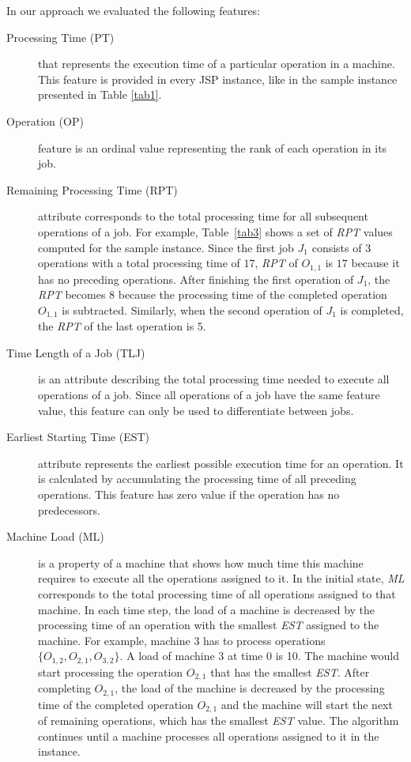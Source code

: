 \documentclass[runningheads]{llncs}
\begin{document}
In our approach we evaluated the following features:
\begin{description}
  \item[Processing Time (PT)] that represents the execution time of a particular operation in a machine. This feature is provided in every JSP instance, like in the sample instance presented in Table \ref{tab1}.
  
  \item[Operation (OP)] feature is an ordinal value representing the rank of each operation in its job.

  \item[Remaining Processing Time (RPT)] attribute corresponds to the total processing time for all subsequent operations of a job. For example, Table~\ref{tab3} shows a set of \textit{RPT} values computed for the sample instance. Since the first job $J_1$ consists of $3$ operations with a total processing time of $17$, \textit{RPT} of $O_{1,1}$ is $17$ because it has no preceding operations. After finishing the first operation of $J_1$, the \textit{RPT} becomes $8$ because the processing time of the completed operation $O_{1,1}$ is subtracted. Similarly, when the second operation of $J_1$ is completed, the \textit{RPT} of the last operation is $5$. 
  
  \item[Time Length of a Job (TLJ)] is an attribute describing the total processing time needed to execute all operations of a job. Since all operations of a job have the same feature value, this feature can only be used to differentiate between jobs.
  
  \item[Earliest Starting Time (EST)] attribute represents the earliest possible execution time for an operation. It is calculated by accumulating the processing time of all preceding operations. This feature has zero value if the operation has no predecessors.
  
  \item[Machine Load (ML)] is a property of a machine that shows how much time this machine requires to execute all the operations assigned to it. In the initial state, \textit{ML} corresponds to the total processing time of all operations assigned to that machine. In each time step, the load of a machine is decreased by the processing time of an operation with the smallest \textit{EST} assigned to the machine. For example, machine $3$ has to process operations $\{ O_{1,2}, O_{2,1}, O_{3,2} \}$. A load of machine $3$ at time $0$ is 10. The machine would start processing the operation $O_{2,1}$ that has the smallest \textit{EST}. After completing $O_{2,1}$, the load of the machine is decreased by the processing time of the completed operation $O_{2,1}$ and the machine will start the next of remaining operations, which has the smallest \textit{EST} value. The algorithm continues until a machine processes all operations assigned to it in the instance.
  

\end{description}
\end{document}
